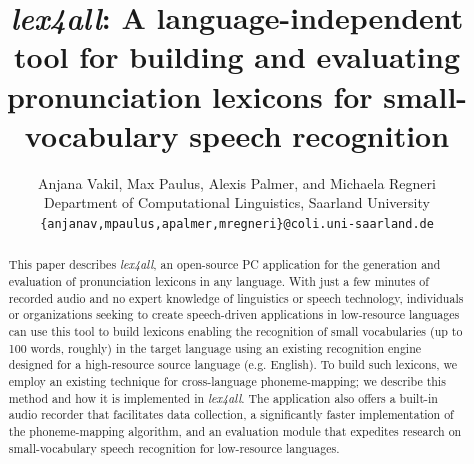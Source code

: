 \documentclass[11pt]{article}
\title{\textit{lex4all}: A language-independent tool for building and evaluating pronunciation lexicons for small-vocabulary speech recognition}
\author{Anjana Vakil, Max Paulus, Alexis Palmer, and Michaela Regneri \\
  Department of Computational Linguistics, %
  Saarland University \\
  {\tt \{anjanav,mpaulus,apalmer,mregneri\}@coli.uni-saarland.de} \\}
\date{}
\begin{document}
\maketitle

\begin{abstract}
This paper describes \textit{lex4all}, an open-source PC application for the generation and evaluation of pronunciation lexicons in any language. 
With just a few minutes of recorded audio and no expert knowledge of linguistics or speech technology, individuals or organizations seeking to create speech-driven applications in low-resource languages can use this tool to build  lexicons enabling 
the recognition of small vocabularies (up to 100 words, roughly) in the target language
using an existing recognition engine designed for a high-resource source language (e.g. English). 
To build such lexicons, we employ an existing technique for cross-language phoneme-mapping; 
we describe this method and how it is implemented in \textit{lex4all}.
The application also offers
a built-in audio recorder that facilitates data collection, 
a significantly faster implementation of the phoneme-mapping algorithm,
and an evaluation module that expedites research on small-vocabulary speech recognition for low-resource languages. 
\end{abstract}


%
\end{document}
